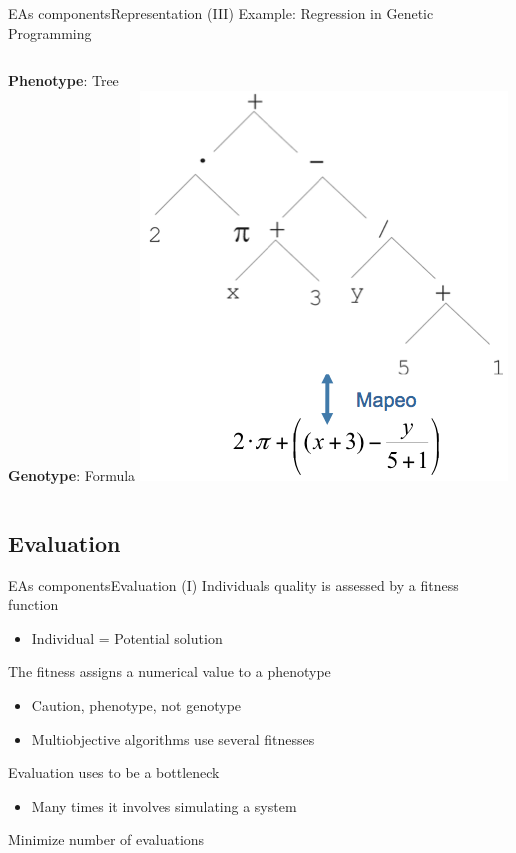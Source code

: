 \documentclass[10pt,compress]{beamer} %
\begin{document}
\begin{frame}{EAs components}{Representation (III)} 
	Example: Regression in Genetic Programming
	\bigskip
    \begin{columns}
	   \textbf{Phenotype}: Tree\\
	   \textbf{Genotype}: Formula
		\includegraphics[width=\linewidth]{figs/gp.png}
	\end{columns}
\end{frame}

\subsection{Evaluation}

\begin{frame}{EAs components}{Evaluation (I)} 
	Individuals quality is assessed by a \alert{fitness function}
	\begin{itemize}
		\item Individual = Potential solution
	\end{itemize}
	The fitness assigns a numerical value to a phenotype
	\begin{itemize}
		\item Caution, phenotype, not genotype
		\item Multiobjective algorithms use several fitnesses
	\end{itemize}
	Evaluation uses to be a bottleneck
	\begin{itemize}
		\item Many times it involves simulating a system
	\end{itemize}
	Minimize number of evaluations
\end{frame}
\end{document}
